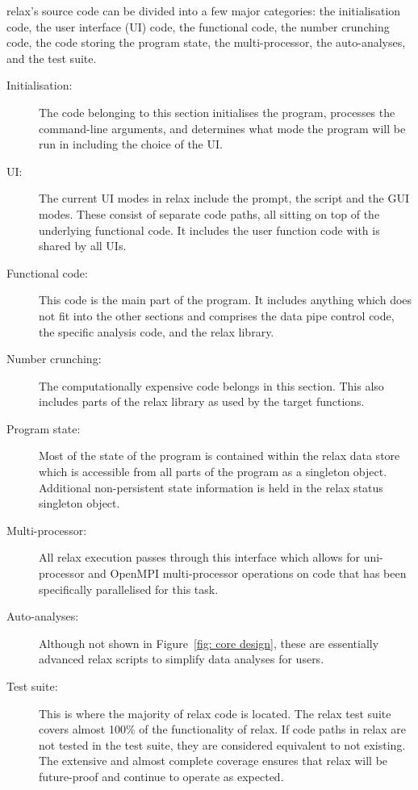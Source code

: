 relax's source code can be divided into a few major categories:  the initialisation code, the user interface (UI) code, the functional code, the number crunching code, the code storing the program state, the multi-processor, the auto-analyses, and the test suite.
\begin{description}
  \item[Initialisation:]  The code belonging to this section initialises the program, processes the command-line arguments, and determines what mode the program will be run in including the choice of the UI.
  \item[UI:]  The current UI modes in relax include the prompt, the script and the GUI modes.
    These consist of separate code paths, all sitting on top of the underlying functional code.
    It includes the user function code with is shared by all UIs.
  \item[Functional code:]  This code is the main part of the program.
    It includes anything which does not fit into the other sections and comprises the data pipe control code, the specific analysis code, and the relax library.
  \item[Number crunching:]  The computationally expensive code belongs in this section.
    This also includes parts of the relax library as used by the target functions.
  \item[Program state:]  Most of the state of the program is contained within the relax data store which is accessible from all parts of the program as a singleton object.
    Additional non-persistent state information is held in the relax status singleton object.
  \item[Multi-processor:]  All relax execution passes through this interface which allows for uni-processor and OpenMPI multi-processor operations on code that has been specifically parallelised for this task.
  \item[Auto-analyses:]  Although not shown in Figure~\ref{fig: core design}, these are essentially advanced relax scripts to simplify data analyses for users.
  \item[Test suite:]  This is where the majority of relax code is located.
    The relax test suite covers almost 100\% of the functionality of relax.
    If code paths in relax are not tested in the test suite, they are considered equivalent to not existing.
    The extensive and almost complete coverage ensures that relax will be future-proof and continue to operate as expected.
\end{description}

